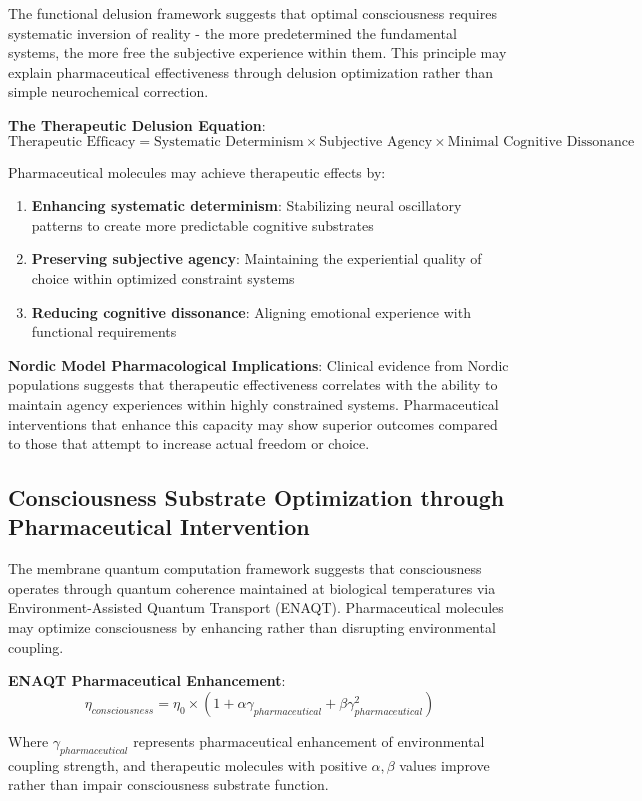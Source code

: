 \documentclass[12pt,a4paper]{article}
\begin{document}
The functional delusion framework suggests that optimal consciousness requires systematic inversion of reality - the more predetermined the fundamental systems, the more free the subjective experience within them. This principle may explain pharmaceutical effectiveness through delusion optimization rather than simple neurochemical correction.

\textbf{The Therapeutic Delusion Equation}:
$$\text{Therapeutic Efficacy} = \text{Systematic Determinism} \times \text{Subjective Agency} \times \text{Minimal Cognitive Dissonance}$$

Pharmaceutical molecules may achieve therapeutic effects by:
\begin{enumerate}
\item \textbf{Enhancing systematic determinism}: Stabilizing neural oscillatory patterns to create more predictable cognitive substrates
\item \textbf{Preserving subjective agency}: Maintaining the experiential quality of choice within optimized constraint systems
\item \textbf{Reducing cognitive dissonance}: Aligning emotional experience with functional requirements
\end{enumerate}

\textbf{Nordic Model Pharmacological Implications}: Clinical evidence from Nordic populations suggests that therapeutic effectiveness correlates with the ability to maintain agency experiences within highly constrained systems. Pharmaceutical interventions that enhance this capacity may show superior outcomes compared to those that attempt to increase actual freedom or choice.

\subsection{Consciousness Substrate Optimization through Pharmaceutical Intervention}

The membrane quantum computation framework suggests that consciousness operates through quantum coherence maintained at biological temperatures via Environment-Assisted Quantum Transport (ENAQT). Pharmaceutical molecules may optimize consciousness by enhancing rather than disrupting environmental coupling.

\textbf{ENAQT Pharmaceutical Enhancement}:
$$\eta_{consciousness} = \eta_0 \times (1 + \alpha \gamma_{pharmaceutical} + \beta \gamma_{pharmaceutical}^2)$$

Where $\gamma_{pharmaceutical}$ represents pharmaceutical enhancement of environmental coupling strength, and therapeutic molecules with positive $\alpha, \beta$ values improve rather than impair consciousness substrate function.
\end{document}
